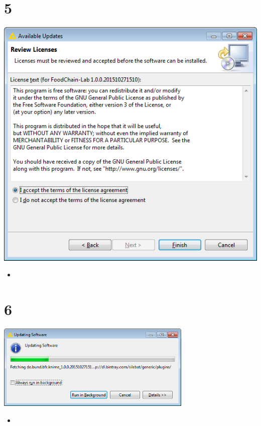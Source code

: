 \documentclass{beamer}
\begin{document}
\section{5}
\begin{frame}
	\begin{center}
  		\includegraphics[height=0.6\textheight]{5.png}
	\end{center}
	\begin{itemize}
		\item
	\end{itemize}
\end{frame}

\section{6}
\begin{frame}
	\begin{center}
  		\includegraphics[width=0.7\textwidth]{6.png}
	\end{center}
	\begin{itemize}
		\item
	\end{itemize}
\end{frame}
\end{document}
